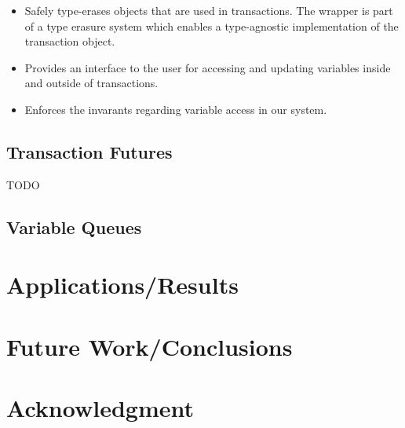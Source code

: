 \documentclass[conference]{IEEEtran}
\begin{document}
\begin{itemize}
\item Safely type-erases objects that are used in transactions. The wrapper is
part of a type erasure system which enables a type-agnostic implementation of
the transaction object.
\item Provides an interface to the user for accessing and updating variables
inside and outside of transactions.
\item Enforces the invarants regarding variable access in our system.
\end{itemize}

\subsection{Transaction Futures}

TODO

\subsection{Variable Queues}

\section{Applications/Results}

\section{Future Work/Conclusions}

\section*{Acknowledgment}

%
%

\end{document}
